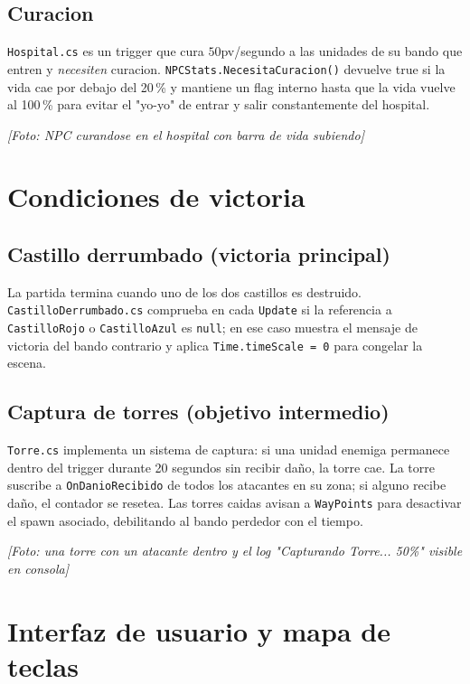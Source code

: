 \documentclass[12pt,a4paper]{article}
\newcommand{\fotoplaceholder}[1]{%
    \par\medskip\noindent%
    \begin{center}%
    \begin{tcolorbox}[
        colback=fotobg,
        colframe=fotoborder,
        boxrule=0.8pt,
        arc=2pt,
        width=0.85\textwidth,
        halign=center,
        valign=center,
        height=2.4cm
    ]
    \itshape\color{gray} [Foto: #1]
    \end{tcolorbox}%
    \end{center}\medskip%
}
\begin{document}
\subsection{Curacion}

\texttt{Hospital.cs} es un trigger que cura $50$pv/segundo a las
unidades de su bando que entren y \emph{necesiten} curacion.
\texttt{NPCStats.NecesitaCuracion()} devuelve true si la vida cae por
debajo del 20\,\% y mantiene un flag interno hasta que la vida vuelve
al 100\,\% para evitar el "yo-yo" de entrar y salir constantemente del
hospital.

\fotoplaceholder{NPC curandose en el hospital con barra de vida subiendo}

\section{Condiciones de victoria}

\subsection{Castillo derrumbado (victoria principal)}

La partida termina cuando uno de los dos castillos es destruido.
\texttt{CastilloDerrumbado.cs} comprueba en cada \texttt{Update} si la
referencia a \texttt{CastilloRojo} o \texttt{CastilloAzul} es
\texttt{null}; en ese caso muestra el mensaje de victoria del bando
contrario y aplica \texttt{Time.timeScale = 0} para congelar la escena.

\subsection{Captura de torres (objetivo intermedio)}

\texttt{Torre.cs} implementa un sistema de captura: si una unidad
enemiga permanece dentro del trigger durante 20 segundos sin recibir
daño, la torre cae. La torre suscribe a \texttt{OnDanioRecibido} de
todos los atacantes en su zona; si alguno recibe daño, el contador se
resetea. Las torres caidas avisan a \texttt{WayPoints} para
desactivar el spawn asociado, debilitando al bando perdedor con el
tiempo.

\fotoplaceholder{una torre con un atacante dentro y el log "Capturando Torre... 50\%" visible en consola}

\section{Interfaz de usuario y mapa de teclas}
\end{document}
